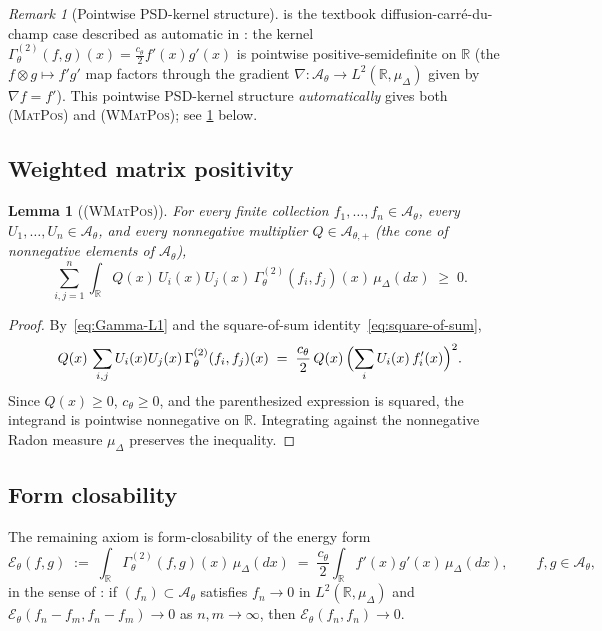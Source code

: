 \documentclass[11pt,reqno]{amsart}
\theoremstyle{plain}
\newtheorem{lemma}[theorem]{Lemma}
\theoremstyle{definition}
\theoremstyle{remark}
\newtheorem{remark}[theorem]{Remark}
\newcommand{\R}{\mathbb{R}}
\newcommand{\cA}{\mathcal A}
\newcommand{\cE}{\mathcal E}
\begin{document}
\begin{remark}[Pointwise PSD-kernel structure]\label{rem:pointwise-PSD}
 is the textbook diffusion-carr\'e-du-champ
case described as automatic in
\cite[Rem.~2.6]{GammaHierarchyDivergence}: the kernel
$\Gamma^{(2)}_{\theta}(f,g)(x)=\frac{c_{\theta}}{2}f'(x)g'(x)$ is
pointwise positive-semidefinite on $\R$ (the
$f\otimes g\mapsto f'g'$ map factors through the gradient
$\nabla\colon\cA_{\theta}\to L^{2}(\R,\mu_{\Delta})$ given by
$\nabla f=f'$). This pointwise PSD-kernel structure
\emph{automatically} gives both \textsc{(MatPos)} and
\textsc{(WMatPos)}; see \cref{lem:wmatpos} below.
\end{remark}

\subsection{Weighted matrix positivity}\label{sec:axioms-wmatpos}

\begin{lemma}[\normalfont\textsc{(WMatPos)}]\label{lem:wmatpos}
For every finite collection $f_{1},\ldots,f_{n}\in\cA_{\theta}$,
every $U_{1},\ldots,U_{n}\in\cA_{\theta}$, and every nonnegative
multiplier $Q\in\cA_{\theta,+}$ (the cone of nonnegative elements
of $\cA_{\theta}$),
\begin{equation}\label{eq:axwmatpos}
  \sum_{i,j=1}^{n}\!\int_{\R}Q(x)\,U_{i}(x)U_{j}(x)\,\Gamma^{(2)}_{\theta}(f_{i},f_{j})(x)\,\mu_{\Delta}(dx)\;\ge\;0.
\end{equation}
\end{lemma}

\begin{proof}
By~\eqref{eq:Gamma-L1} and the square-of-sum
identity~\eqref{eq:square-of-sum},
\[
  Q(x)\,\sum_{i,j}U_{i}(x)U_{j}(x)\,\Gamma^{(2)}_{\theta}(f_{i},f_{j})(x)
  \;=\;\frac{c_{\theta}}{2}\,Q(x)\,\Bigl(\sum_{i}U_{i}(x)\,f_{i}'(x)\Bigr)^{2}.
\]
Since $Q(x)\ge 0$, $c_{\theta}\ge 0$, and the parenthesized
expression is squared, the integrand is pointwise nonnegative on
$\R$. Integrating against the nonnegative Radon measure
$\mu_{\Delta}$ preserves the inequality.
\end{proof}

\subsection{Form closability}\label{sec:axioms-formclos}

The remaining axiom is form-closability of the energy form
\begin{equation}\label{eq:cE-theta}
  \cE_{\theta}(f,g)\;:=\;\int_{\R}\Gamma^{(2)}_{\theta}(f,g)(x)\,\mu_{\Delta}(dx)
  \;=\;\frac{c_{\theta}}{2}\!\int_{\R}f'(x)g'(x)\,\mu_{\Delta}(dx),
  \qquad f,g\in\cA_{\theta},
\end{equation}
in the sense of \cite[\textsc{(FormClos)} of
Ass.~2.4]{GammaHierarchyDivergence}: if $(f_{n})\subset\cA_{\theta}$
satisfies $f_{n}\to 0$ in $L^{2}(\R,\mu_{\Delta})$ and
$\cE_{\theta}(f_{n}-f_{m},f_{n}-f_{m})\to 0$ as $n,m\to\infty$,
then $\cE_{\theta}(f_{n},f_{n})\to 0$.
\end{document}

